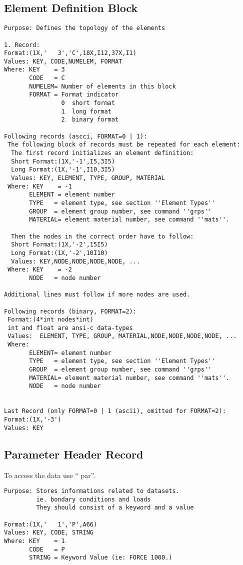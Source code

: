 \documentclass{article}
\begin{document}
\subsection{\label{Element Definition Block}Element Definition Block}
\begin{verbatim}
Purpose: Defines the topology of the elements

1. Record:
Format:(1X,'   3','C',18X,I12,37X,I1)
Values: KEY, CODE,NUMELEM, FORMAT
Where: KEY    = 3
       CODE   = C
       NUMELEM= Number of elements in this block
       FORMAT = Format indicator
                0  short format
                1  long format 
                2  binary format 

Following records (ascci, FORMAT=0 | 1):
 The following block of records must be repeated for each element:
  The first record initializes an element definition:
  Short Format:(1X,'-1',I5,3I5)
  Long Format:(1X,'-1',I10,3I5)
  Values: KEY, ELEMENT, TYPE, GROUP, MATERIAL
 Where: KEY    = -1
       ELEMENT = element number
       TYPE   = element type, see section ''Element Types''
       GROUP  = element group number, see command ''grps''
       MATERIAL= element material number, see command ''mats''.

  Then the nodes in the correct order have to follow:
  Short Format:(1X,'-2',15I5)
  Long Format:(1X,'-2',10I10)
  Values: KEY,NODE,NODE,NODE,NODE, ...
 Where: KEY    = -2
       NODE   = node number

Additional lines must follow if more nodes are used.

Following records (binary, FORMAT=2):
 Format:(4*int nodes*int)
 int and float are ansi-c data-types
 Values:  ELEMENT, TYPE, GROUP, MATERIAL,NODE,NODE,NODE,NODE, ...
 Where:
       ELEMENT= element number
       TYPE   = element type, see section ''Element Types''
       GROUP  = element group number, see command ''grps''
       MATERIAL= element material number, see command ''mats''.
       NODE   = node number
  
  
Last Record (only FORMAT=0 | 1 (ascii), omitted for FORMAT=2):
Format:(1X,'-3')
Values: KEY
\end{verbatim}

\subsection{\label{Parameter Header Record}Parameter Header Record}
To access the data use `` par''.
\begin{verbatim}
Purpose: Stores informations related to datasets.
         ie. bondary conditions and loads
         They should consist of a keyword and a value

Format:(1X,'   1','P',A66)  
Values: KEY, CODE, STRING
Where: KEY    = 1
       CODE   = P
       STRING = Keyword Value (ie: FORCE 1000.)

\end{verbatim}
\end{document}
